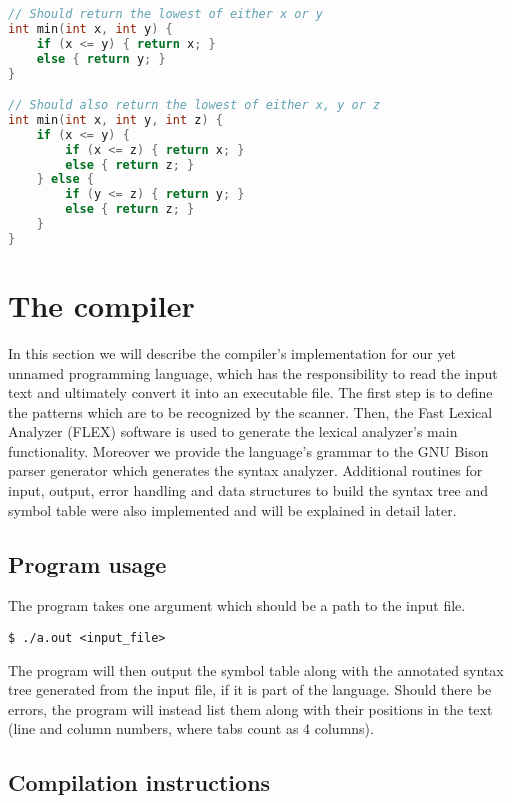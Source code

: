 \documentclass[12pt]{article}
\begin{document}
\begin{lstlisting}[language=C]
// Should return the lowest of either x or y
int min(int x, int y) {
	if (x <= y) { return x; }
	else { return y; }
}

// Should also return the lowest of either x, y or z
int min(int x, int y, int z) {
	if (x <= y) {
		if (x <= z) { return x; }
		else { return z; }
	} else {
		if (y <= z) { return y; }
		else { return z; }
	}
}
\end{lstlisting}




\clearpage

\section{The compiler}
In this section we will describe the compiler's implementation for our yet unnamed programming
language, which has the responsibility to read the input text and ultimately convert it into an
executable file. The first step is to define the patterns which are to be recognized by the scanner.
Then, the Fast Lexical Analyzer (FLEX) \cite{FLEX} software is used to generate the lexical
analyzer's main functionality. Moreover we provide the language's grammar to the GNU Bison parser
generator \cite{BISON} which generates the syntax analyzer. Additional routines for input, output,
error handling and data structures to build the syntax tree and symbol table were also implemented
and will be explained in detail later.


\subsection{Program usage}
The program takes one argument which should be a path to the input file.

\begin{lstlisting}
$ ./a.out <input_file>
\end{lstlisting}

The program will then output the symbol table along with the
annotated syntax tree generated from the input file, if it is part of the language.
Should there be errors, the program will instead list them along with their
positions in the text (line and column numbers, where tabs count as 4 columns).

\subsection{Compilation instructions}
\end{document}
